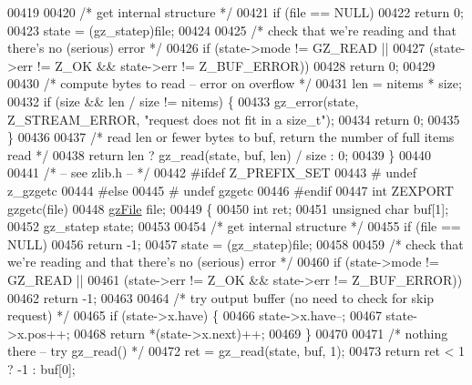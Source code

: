 \begin{DoxyCode}
00419 
00420     \textcolor{comment}{/* get internal structure */}
00421     \textcolor{keywordflow}{if} (file == NULL)
00422         \textcolor{keywordflow}{return} 0;
00423     state = (gz\_statep)file;
00424 
00425     \textcolor{comment}{/* check that we're reading and that there's no (serious) error */}
00426     \textcolor{keywordflow}{if} (state->mode != GZ\_READ ||
00427             (state->err != Z\_OK && state->err != Z\_BUF\_ERROR))
00428         \textcolor{keywordflow}{return} 0;
00429 
00430     \textcolor{comment}{/* compute bytes to read -- error on overflow */}
00431     len = nitems * size;
00432     \textcolor{keywordflow}{if} (size && len / size != nitems) \{
00433         gz\_error(state, Z\_STREAM\_ERROR, \textcolor{stringliteral}{"request does not fit in a size\_t"});
00434         \textcolor{keywordflow}{return} 0;
00435     \}
00436 
00437     \textcolor{comment}{/* read len or fewer bytes to buf, return the number of full items read */}
00438     \textcolor{keywordflow}{return} len ? gz\_read(state, buf, len) / size : 0;
00439 \}
00440 
00441 \textcolor{comment}{/* -- see zlib.h -- */}
00442 \textcolor{preprocessor}{#ifdef Z\_PREFIX\_SET}
00443 \textcolor{preprocessor}{#  undef z\_gzgetc}
00444 \textcolor{preprocessor}{#else}
00445 \textcolor{preprocessor}{#  undef gzgetc}
00446 \textcolor{preprocessor}{#endif}
00447 \textcolor{keywordtype}{int} ZEXPORT gzgetc(file)
00448     \hyperlink{structgz_file__s}{gzFile} file;
00449 \{
00450     \textcolor{keywordtype}{int} ret;
00451     \textcolor{keywordtype}{unsigned} \textcolor{keywordtype}{char} buf[1];
00452     gz\_statep state;
00453 
00454     \textcolor{comment}{/* get internal structure */}
00455     \textcolor{keywordflow}{if} (file == NULL)
00456         \textcolor{keywordflow}{return} -1;
00457     state = (gz\_statep)file;
00458 
00459     \textcolor{comment}{/* check that we're reading and that there's no (serious) error */}
00460     \textcolor{keywordflow}{if} (state->mode != GZ\_READ ||
00461         (state->err != Z\_OK && state->err != Z\_BUF\_ERROR))
00462         \textcolor{keywordflow}{return} -1;
00463 
00464     \textcolor{comment}{/* try output buffer (no need to check for skip request) */}
00465     \textcolor{keywordflow}{if} (state->x.have) \{
00466         state->x.have--;
00467         state->x.pos++;
00468         \textcolor{keywordflow}{return} *(state->x.next)++;
00469     \}
00470 
00471     \textcolor{comment}{/* nothing there -- try gz\_read() */}
00472     ret = gz\_read(state, buf, 1);
00473     \textcolor{keywordflow}{return} ret < 1 ? -1 : buf[0];

\end{DoxyCode}
